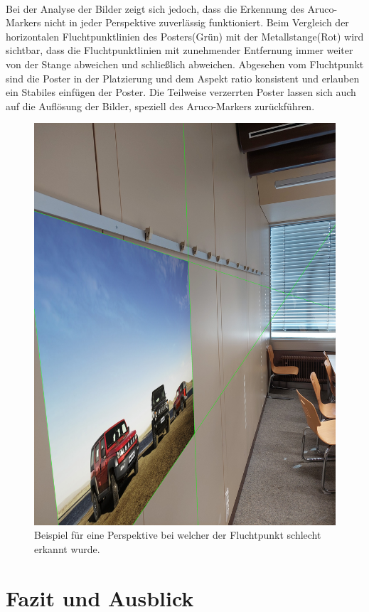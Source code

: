 \documentclass[a4paper,twocolumn]{article}
\begin{document}
\\
Bei der Analyse der Bilder zeigt sich jedoch, dass die Erkennung des Aruco-Markers nicht in jeder Perspektive zuverlässig funktioniert. Beim Vergleich der horizontalen Fluchtpunktlinien des Posters(Grün) mit der Metallstange(Rot) wird sichtbar, dass die Fluchtpunktlinien mit zunehmender Entfernung immer weiter von der Stange abweichen und schließlich abweichen.
Abgesehen vom Fluchtpunkt sind die Poster in der Platzierung und dem Aspekt ratio konsistent und erlauben ein Stabiles einfügen der Poster. Die Teilweise verzerrten Poster lassen sich auch auf die Auflösung der Bilder, speziell des Aruco-Markers zurückführen.
\begin{figure}[h!]
    \centering
    \includegraphics[width=0.9\columnwidth]{img/img_result_bad_113437.jpg} %
    \caption{Beispiel für eine Perspektive bei welcher der Fluchtpunkt schlecht erkannt wurde.}
    \label{fig:bad-example-result}
\end{figure}

\section{Fazit und Ausblick}
\end{document}
